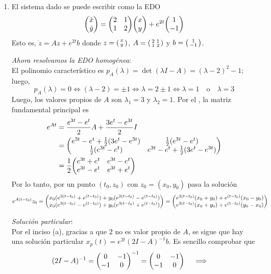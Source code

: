 \begin{sol}[Demostración]
\begin{enumerate}[label = (\alph*)]
\item El sistema dado se puede escribir como la EDO
\[
\mqty(\dot{x}\\\dot{y}) = \mqty(2&1\\1&2)\mqty(x\\y) + e^{2t}\mqty(1\\-1)
\]
Esto es, $\dot{z} = Az + e^{2t}b$ donde $z = \smqty(x\\y)$, $A = \smqty(2&1\\1&2)$ y $b = \smqty(1\\-1)$.\par\vspace{1em}
\emph{Ahora resolvamos la EDO homogénea}:\\
El polinomio característico es $p_A(\lambda) = \operatorname{det}(\lambda I - A) = (\lambda - 2)^2 - 1$; luego,
\[
p_A(\lambda) = 0%
\iff%
(\lambda-2) = \pm 1%
\iff%
\lambda = 2 \pm1%
\iff%
\lambda = 1\quad\text{o}\quad \lambda = 3
\]
Luego, los valores propios de $A$ son $\lambda_1 = 3$ y $\lambda_2 = 1$. Por el , la matriz fundamental principal es 
\begin{align*}
e^{At}%
&= \frac{e^{3t} - e^{t}}{2} A + \frac{3e^{t} - e^{3t}}{2} I\\
&= \mqty(%
    e^{3t} - e^t + \frac{1}{2}(3e^{t} - e^{3t}) & \frac{1}{2}(e^{3t} - e^{t})\\
    \frac{1}{2}(e^{3t} - e^{t})                 & e^{3t} - e^t + \frac{1}{2}(3e^{t} - e^{3t}) 
   )\\
&= \frac{1}{2}\mqty(%
   e^{3t} + e^t & e^{3t} - e^t\\
   e^{3t} - e^t & e^{3t} + e^t
   )
\end{align*}
Por lo tanto, por un punto $(t_0,z_0)$ con $z_0 = (x_0,y_0)$ pasa la solución 
\[
e^{A(t-t_0)}z_0%
= \mqty(
    x_0(e^{3(t-t_0)} + e^{(t-t_0)}) + y_0(e^{3(t-t_0)} - e^{(t-t_0)})\\
    x_0(e^{3(t-t_0)} - e^{(t-t_0)}) + y_0(e^{3(t-t_0)} + e^{(t-t_0)})
)%
=\mqty(%
    e^{3(t-t_0)}(x_0+y_0) + e^{(t-t_0)}(x_0-y_0)\\
    e^{3(t-t_0)}(x_0+y_0) + e^{(t-t_0)}(y_0-x_0)
)
\]
\par
\emph{Solución particular}:\\
Por el inciso (a), gracias a que $2$ no es valor propio de $A$, se sigue que hay una solución particular $x_p(t) = e^{2t}(2I-A)^{-1}b$. Es sencillo comprobar que 
\[
(2I-A)^{-1} = \mqty(0&-1\\-1&0)^{-1} = \mqty(0&-1\\-1&0)
\quad\implies\quad%
\]
\end{enumerate}
\end{sol}
